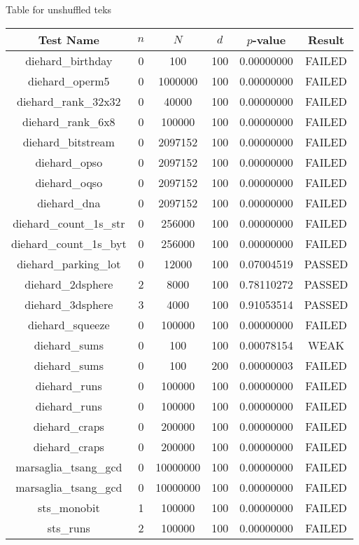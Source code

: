 Table for unshuffled teks
\begin{longtable}{cccccc}
\toprule
Test Name & $n$ & $N$ & $d$ & $p$-value & Result \\
\midrule
\endhead
diehard\_birthday & 0 & 100 & 100 & 0.00000000 & FAILED \\
diehard\_operm5 & 0 & 1000000 & 100 & 0.00000000 & FAILED \\
diehard\_rank\_32x32 & 0 & 40000 & 100 & 0.00000000 & FAILED \\
diehard\_rank\_6x8 & 0 & 100000 & 100 & 0.00000000 & FAILED \\
diehard\_bitstream & 0 & 2097152 & 100 & 0.00000000 & FAILED \\
diehard\_opso & 0 & 2097152 & 100 & 0.00000000 & FAILED \\
diehard\_oqso & 0 & 2097152 & 100 & 0.00000000 & FAILED \\
diehard\_dna & 0 & 2097152 & 100 & 0.00000000 & FAILED \\
diehard\_count\_1s\_str & 0 & 256000 & 100 & 0.00000000 & FAILED \\
diehard\_count\_1s\_byt & 0 & 256000 & 100 & 0.00000000 & FAILED \\
diehard\_parking\_lot & 0 & 12000 & 100 & 0.07004519 & PASSED \\
diehard\_2dsphere & 2 & 8000 & 100 & 0.78110272 & PASSED \\
diehard\_3dsphere & 3 & 4000 & 100 & 0.91053514 & PASSED \\
diehard\_squeeze & 0 & 100000 & 100 & 0.00000000 & FAILED \\
diehard\_sums & 0 & 100 & 100 & 0.00078154 & WEAK \\
diehard\_sums & 0 & 100 & 200 & 0.00000003 & FAILED \\
diehard\_runs & 0 & 100000 & 100 & 0.00000000 & FAILED \\
diehard\_runs & 0 & 100000 & 100 & 0.00000000 & FAILED \\
diehard\_craps & 0 & 200000 & 100 & 0.00000000 & FAILED \\
diehard\_craps & 0 & 200000 & 100 & 0.00000000 & FAILED \\
marsaglia\_tsang\_gcd & 0 & 10000000 & 100 & 0.00000000 & FAILED \\
marsaglia\_tsang\_gcd & 0 & 10000000 & 100 & 0.00000000 & FAILED \\
sts\_monobit & 1 & 100000 & 100 & 0.00000000 & FAILED \\
sts\_runs & 2 & 100000 & 100 & 0.00000000 & FAILED \\

\end{longtable}
